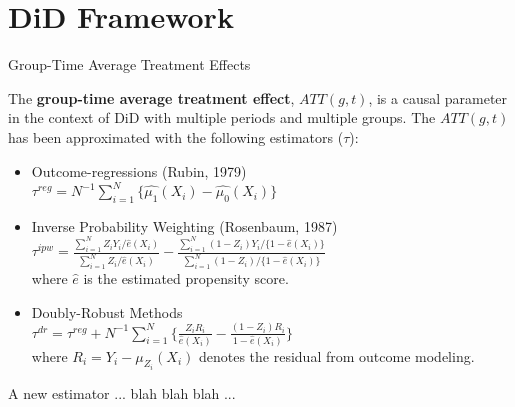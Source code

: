 \section{DiD Framework}


\begin{frame}{Group-Time Average Treatment Effects}

The \textbf{group-time average treatment effect}, $ATT(g,t)$, is a causal parameter in the context of DiD with multiple periods and multiple groups. The $ATT(g,t)$ has been approximated with the following estimators ($\tau$): \\
\vspace{5pt}
\begin{itemize}
    \item Outcome-regressions (Rubin, 1979) \\
    \vspace{3pt}
    $\tau^{reg} = N^{-1} \sum_{i=1}^{N}\{\hat{\mu_{1}}(X_{i}) - \hat{\mu_{0}}(X_{i}) \}$
    \vspace{-7pt}
    \item Inverse Probability Weighting (Rosenbaum, 1987) \\
    \vspace{3pt}
    $\tau^{ipw} = \frac{\sum_{i=1}^{N} Z_i Y_i / \hat{e}(X_i)}{\sum_{i=1}^{N} Z_i / \hat{e}(X_i)} - \frac{\sum_{i=1}^{N} (1-Z_i) Y_i / \{1 - \hat{e}(X_i)\}}{\sum_{i=1}^{N} (1-Z_i) / \{1 - \hat{e}(X_i)\}}$ \\
    \vspace{3pt}
    \footnotesize{where $\hat{e}$ is the estimated propensity score.} 
    \vspace{-7pt}
    \item Doubly-Robust Methods \\
    \vspace{3pt}
    $\tau^{dr} = \tau^{reg} + N^{-1} \sum_{i=1}^{N} \{ \frac{Z_i R_i}{\hat{e}(X_i)} - \frac{(1-Z_i) R_i}{1 - \hat{e}(X_i)} \}$ \\
    \vspace{3pt}
    \footnotesize{where $R_i = Y_i - \mu_{Z_{i}}(X_i)$ denotes the residual from outcome modeling.}
\end{itemize}
\end{frame}

\begin{frame}{A new estimator}
... blah blah blah ...
\end{frame}

